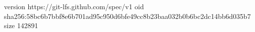 version https://git-lfs.github.com/spec/v1
oid sha256:58bc6b7bbf8e6b701ad95c950d6bfe49cc8b23baa032b0b6bc2dc14bb6d035b7
size 142891
